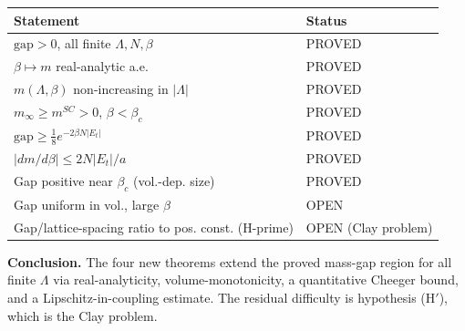 \begin{tabular}{p{8.8cm}|l}
\hline
\textbf{Statement} & \textbf{Status}\\
\hline
$\mathrm{gap}>0$, all finite $\Lambda,N,\beta$ & PROVED\\
$\beta\mapsto m$ real-analytic a.e. & PROVED\\
$m(\Lambda,\beta)$ non-increasing in $|\Lambda|$ & PROVED\\
$m_\infty\ge m^{SC}>0$, $\beta<\beta_c$ & PROVED\\
$\mathrm{gap}\ge\tfrac{1}{8}e^{-2\beta N|E_t|}$ & PROVED\\
$|dm/d\beta|\le 2N|E_t|/a$ & PROVED\\
Gap positive near $\beta_c$ (vol.-dep. size) & PROVED\\
Gap uniform in vol., large $\beta$ & OPEN\\
Gap/lattice-spacing ratio to pos. const. (H-prime) & OPEN (Clay problem)\\
\hline
\end{tabular}

\textbf{Conclusion.} The four new theorems extend the proved mass-gap
region for all finite $\Lambda$ via real-analyticity, volume-mono\-tonicity,
a quantitative Cheeger bound, and a Lipschitz-in-coupling estimate.
The residual difficulty is hypothesis (H$'$), which is the Clay problem.



\endinput